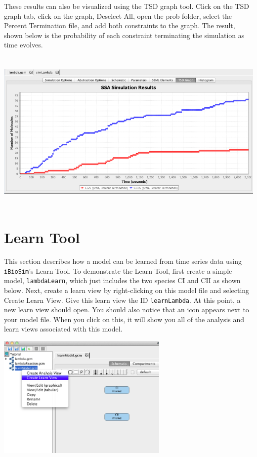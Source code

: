 \documentclass[titlepage,11pt]{article}
\begin{document}
These results can also be visualized using the TSD graph tool.  Click on the TSD graph tab, click on the graph, Deselect All, open the prob folder, select the Percent Termination file, and add both constraints to the graph.  The result, shown below is the probability of each constraint terminating the simulation as time evolves.  

\begin{center} 
\includegraphics[height=80mm]{screenshots/probResultsTSD}
\end{center}

\section{Learn Tool}

This section describes how a model can be learned from time series data using {\tt iBioSim}'s Learn Tool.  To demonstrate the Learn Tool, first create a simple model, {\tt lambdaLearn}, which just includes the two species CI and CII as shown below.  Next, create a learn view by right-clicking on this model file and selecting Create Learn View.  Give this learn view the ID {\tt learnLambda}.  At this point, a new learn view should open.  You should also notice that an icon appears next to your model file.  When you click on this, it will show you all of the analysis and learn views associated with this model.

\begin{center}
\includegraphics[height=60mm]{screenshots/createLearn}
\end{center}
\end{document}
